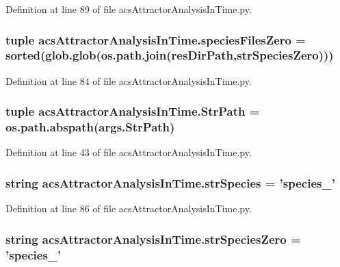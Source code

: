 Definition at line 89 of file acs\-Attractor\-Analysis\-In\-Time.\-py.

\hypertarget{a00092_a4657fd3a80cf1c76ab075d62d8de3bf3}{
\subsubsection[{species\-Files\-Zero}]{\setlength{\rightskip}{0pt plus 5cm}tuple acs\-Attractor\-Analysis\-In\-Time.\-species\-Files\-Zero = sorted(glob.\-glob(os.\-path.\-join({\bf res\-Dir\-Path},{\bf str\-Species\-Zero})))}}\label{a00092_a4657fd3a80cf1c76ab075d62d8de3bf3}


Definition at line 84 of file acs\-Attractor\-Analysis\-In\-Time.\-py.

\hypertarget{a00092_a1d168f4d444ea1d02f186a7568344fba}{
\subsubsection[{Str\-Path}]{\setlength{\rightskip}{0pt plus 5cm}tuple acs\-Attractor\-Analysis\-In\-Time.\-Str\-Path = os.\-path.\-abspath(args.\-Str\-Path)}}\label{a00092_a1d168f4d444ea1d02f186a7568344fba}


Definition at line 43 of file acs\-Attractor\-Analysis\-In\-Time.\-py.

\hypertarget{a00092_ac1f05e7db61bcc83ea1ed27460462202}{
\subsubsection[{str\-Species}]{\setlength{\rightskip}{0pt plus 5cm}string acs\-Attractor\-Analysis\-In\-Time.\-str\-Species = 'species\-\_\-'}}\label{a00092_ac1f05e7db61bcc83ea1ed27460462202}


Definition at line 86 of file acs\-Attractor\-Analysis\-In\-Time.\-py.

\hypertarget{a00092_aea2d717887265b294c623099d2495d4f}{
\subsubsection[{str\-Species\-Zero}]{\setlength{\rightskip}{0pt plus 5cm}string acs\-Attractor\-Analysis\-In\-Time.\-str\-Species\-Zero = 'species\-\_\-'}}\label{a00092_aea2d717887265b294c623099d2495d4f}


